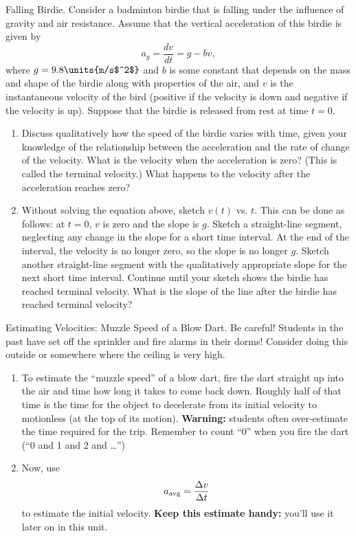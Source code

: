\begin{aproblem}{Falling Birdie.}  Consider a badminton birdie that is
  falling under the influence of gravity and air resistance.  Assume
  that the vertical acceleration of this birdie is given by
  \[ a_y = \frac{dv}{dt} = g - bv, \] 
  where $g = 9.8\units{m/s$^2$}$ and $b$ is some constant that
  depends on the mass and shape of the birdie along with properties of
  the air, and $v$ is the instantaneous velocity of the bird (positive
  if the velocity is down and negative if the velocity is up).
  Suppose that the birdie is released from rest at time $t=0$.

  \begin{enumerate}

  \item Discuss qualitatively how the speed of the birdie varies with
    time, given your knowledge of the relationship between the
    acceleration and the rate of change of the velocity.  What is the
    velocity when the acceleration is zero?  (This is called the
    terminal velocity.)  What happens to the velocity after the
    acceleration reaches zero?

  \item Without solving the equation above, sketch $v(t)$ vs. $t$.
    This can be done as follows: at $t=0$, $v$ is zero and the slope
    is $g$.  Sketch a straight-line segment, neglecting any change in
    the slope for a short time interval. At the end of the interval,
    the velocity is no longer zero, so the slope is no longer $g$.
    Sketch another straight-line segment with the qualitatively
    appropriate slope for the next short time interval.  Continue
    until your sketch shows the birdie has reached terminal velocity.
    What is the slope of the line after the birdie has reached
    terminal velocity?
  \end{enumerate}
  \label{prob:falling_birdie}
\end{aproblem}

\begin{aproblem}{Estimating Velocities: Muzzle Speed of a Blow Dart.}
  \label{prob:dartI}
  Be careful!  Students in the past have set off the sprinkler and
  fire alarms in their dorms!  Consider doing this outside or
  somewhere where the ceiling is very high.
  \begin{enumerate}
  \item To estimate the ``muzzle speed'' of a blow dart, fire the dart
    straight up into the air and time how long it takes to come back
    down.  Roughly half of that time is the time for the object to
    decelerate from its initial velocity to motionless (at the top of
    its motion).  {\bf Warning:} students often over-estimate the time
    required for the trip.  Remember to count ``0'' when you fire the
    dart (``0 and 1 and 2 and \dots'')

  \item Now, use
    \[ a_{\rm avg} = \frac{\Delta v}{\Delta t} \] to estimate the
    initial velocity.  {\bf Keep this estimate handy:} you'll use it
    later on in this unit.
  \end{enumerate}
\end{aproblem}


